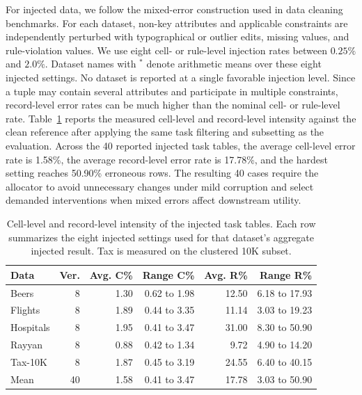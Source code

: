 \documentclass[sigconf, nonacm]{acmart}
\begin{document}
For injected data, we follow the mixed-error construction used in data cleaning benchmarks. For each dataset, non-key attributes and applicable constraints are independently perturbed with typographical or outlier edits, missing values, and rule-violation values. We use eight cell- or rule-level injection rates between $0.25\%$ and $2.0\%$. Dataset names with $^*$ denote arithmetic means over these eight injected settings. No dataset is reported at a single favorable injection level. Since a tuple may contain several attributes and participate in multiple constraints, record-level error rates can be much higher than the nominal cell- or rule-level rate. Table~\ref{tab:injection-strength} reports the measured cell-level and record-level intensity against the clean reference after applying the same task filtering and subsetting as the evaluation. Across the 40 reported injected task tables, the average cell-level error rate is 1.58\%, the average record-level error rate is 17.78\%, and the hardest setting reaches 50.90\% erroneous rows. The resulting 40 cases require the allocator to avoid unnecessary changes under mild corruption and select demanded interventions when mixed errors affect downstream utility.

\begin{table}[t]
  \caption{Cell-level and record-level intensity of the injected task tables. Each row summarizes the eight injected settings used for that dataset's aggregate injected result. Tax is measured on the clustered 10K subset.}
  \label{tab:injection-strength}
  \centering
  \small
  \begin{tabular}{@{}lrrrrr@{}}
    \toprule
    Data & Ver. & Avg. C\% & Range C\% & Avg. R\% & Range R\% \\
    \midrule
    Beers & 8 & 1.30 & 0.62 to 1.98 & 12.50 & 6.18 to 17.93 \\
    Flights & 8 & 1.89 & 0.44 to 3.35 & 11.14 & 3.03 to 19.23 \\
    Hospitals & 8 & 1.95 & 0.41 to 3.47 & 31.00 & 8.30 to 50.90 \\
    Rayyan & 8 & 0.88 & 0.42 to 1.34 & 9.72 & 4.90 to 14.20 \\
    Tax-10K & 8 & 1.87 & 0.45 to 3.19 & 24.55 & 6.40 to 40.15 \\
    \midrule
    Mean & 40 & 1.58 & 0.41 to 3.47 & 17.78 & 3.03 to 50.90 \\
    \bottomrule
  \end{tabular}
\end{table}
\end{document}
